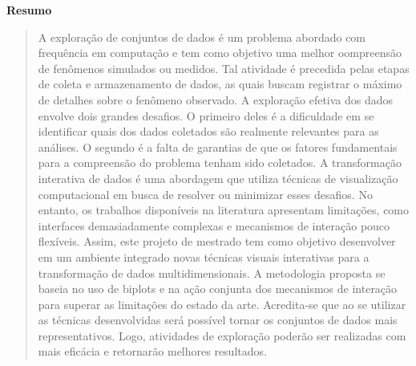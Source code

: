 \begin{center}
  \textbf{Resumo}
\end{center}

\begin{quotation}
\noindent
%
A exploração de conjuntos de dados é um problema abordado
com frequência em computação e tem como objetivo uma melhor
oompreensão de fenômenos simulados ou medidos.
%
Tal atividade é precedida pelas etapas de coleta e
armazenamento de dados, as quais buscam registrar o máximo
de detalhes sobre o fenômeno observado.
%
A exploração efetiva dos dados envolve dois grandes
desafios. O primeiro deles é a dificuldade em se
identificar quais dos dados coletados são realmente
relevantes para as análises. O segundo é a falta de
garantias de que os fatores fundamentais para a compreensão
do problema tenham sido coletados.
% 
A transformação interativa de dados é uma abordagem que
utiliza técnicas de visualização computacional em busca de
resolver ou minimizar esses desafios. No entanto, os
trabalhos disponíveis na literatura apresentam limitações,
como interfaces demasiadamente complexas e mecanismos de
interação pouco flexíveis. 
%
Assim, este projeto de mestrado tem como objetivo
desenvolver em um ambiente integrado novas técnicas visuais
interativas para a transformação de dados multidimensionais.
A metodologia proposta se baseia no uso de biplots e na
ação conjunta dos mecanismos de interação para superar as
limitações do estado da arte.
%
Acredita-se que ao se utilizar as técnicas desenvolvidas
será possível tornar os conjuntos de dados mais
representativos. Logo, atividades de exploração poderão ser
realizadas com mais eficácia e retornarão melhores
resultados.
\end{quotation}

\clearpage
